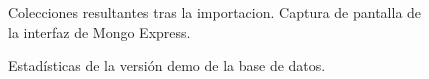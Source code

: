 \begin{figure}[H]
    \centering
    \caption{Colecciones resultantes tras la importacion. Captura de pantalla de la interfaz de Mongo Express.}
    \label{fig:db_full_list}
\end{figure}

\begin{figure}[H]
    \centering
    \caption{Estadísticas de la versión demo de la base de datos.}
    \label{fig:stats_demo}
\end{figure}

